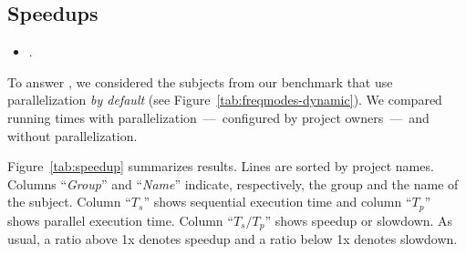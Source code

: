 \begin{center}
\end{center}

\subsection{Speedups}
\label{sec:rqD}

\begin{itemize}
    \item \numRQSpeedupOne{}. \textbf{\RQSpeedupOne}
\end{itemize}

To answer \numRQSpeedupOne{}, we considered the \numProjectsPar{}
subjects from our benchmark that use parallelization \emph{by default}
(see Figure~\ref{tab:freqmodes-dynamic}).  We compared running times
with parallelization~---~configured by project owners~---~and without
parallelization.


Figure~\ref{tab:speedup} summarizes results.  Lines are sorted by
project names.  Columns ``\emph{Group}'' and
``\emph{Name}'' indicate, respectively, the group and the name of the
subject.  Column ``$T_s$'' shows sequential execution time and column
``$T_p$'' shows parallel execution time. Column ``$T_s/T_p$'' shows
speedup or slowdown.  As usual, a ratio above 1x denotes speedup
and a ratio below 1x denotes slowdown.

